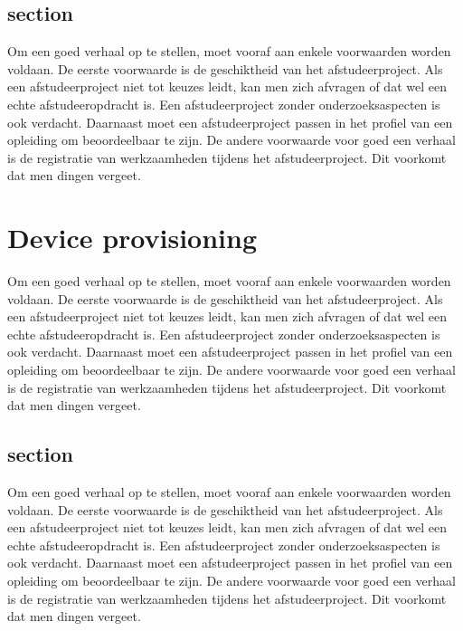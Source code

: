 		\section{section}
		
		Om een goed verhaal op te stellen, moet vooraf aan enkele voorwaarden
		worden voldaan. De eerste voorwaarde is de geschiktheid van het
		afstudeerproject. Als een afstudeerproject niet tot keuzes leidt, kan
		men zich afvragen of dat wel een echte afstudeeropdracht is. Een
		afstudeerproject zonder onderzoeksaspecten is ook verdacht. Daarnaast
		moet een afstudeerproject passen in het profiel van een opleiding om
		beoordeelbaar te zijn. De andere voorwaarde voor goed een verhaal is
		de registratie van werkzaamheden tijdens het afstudeerproject. Dit
		voorkomt dat men dingen vergeet.
		
		
		\chapter{Device provisioning}
		
		Om een goed verhaal op te stellen, moet vooraf aan enkele voorwaarden
		worden voldaan. De eerste voorwaarde is de geschiktheid van het
		afstudeerproject. Als een afstudeerproject niet tot keuzes leidt, kan
		men zich afvragen of dat wel een echte afstudeeropdracht is. Een
		afstudeerproject zonder onderzoeksaspecten is ook verdacht. Daarnaast
		moet een afstudeerproject passen in het profiel van een opleiding om
		beoordeelbaar te zijn. De andere voorwaarde voor goed een verhaal is
		de registratie van werkzaamheden tijdens het afstudeerproject. Dit
		voorkomt dat men dingen vergeet.
		\section{section}
		
		Om een goed verhaal op te stellen, moet vooraf aan enkele voorwaarden
		worden voldaan. De eerste voorwaarde is de geschiktheid van het
		afstudeerproject. Als een afstudeerproject niet tot keuzes leidt, kan
		men zich afvragen of dat wel een echte afstudeeropdracht is. Een
		afstudeerproject zonder onderzoeksaspecten is ook verdacht. Daarnaast
		moet een afstudeerproject passen in het profiel van een opleiding om
		beoordeelbaar te zijn. De andere voorwaarde voor goed een verhaal is
		de registratie van werkzaamheden tijdens het afstudeerproject. Dit
		voorkomt dat men dingen vergeet.
		
